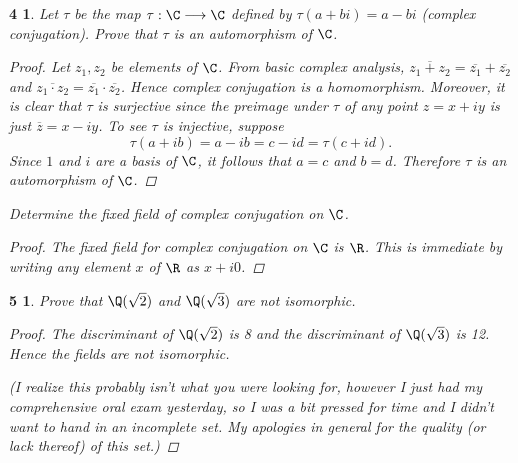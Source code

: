 \documentclass[10pt]{amsart}
\begin{document}
\newtheorem*{4}{4}

\begin{4}
  \label{Ex4}
  Let $\tau$ be the map $\tau:\C \longrightarrow \C$ defined by $\tau(a + bi) = a - bi$ (complex conjugation).
  Prove that $\tau$ is an automorphism of $\C$.
  
  \begin{proof}
    Let $z_1, z_2$ be elements of $\C$.
    From basic complex analysis, $\overline{z_1 + z_2} = \overline{z_1} + \overline{z_2}$ and $\overline{z_1 \cdot z_2} = \overline{z_1}\cdot\overline{z_2}$.
    Hence complex conjugation is a homomorphism.
    Moreover, it is clear that $\tau$ is surjective since the preimage under $\tau$ of any point $z = x + iy$ is just $\overline{z} = x - iy$.
    To see $\tau$ is injective, suppose $$\tau(a+ib) = a - ib = c - id= \tau(c + id).$$
    Since $1$ and $i$ are a basis of $\C$, it follows that $a = c$ and $b = d$.
    Therefore $\tau$ is an automorphism of $\C$.
  \end{proof}

  Determine the fixed field of complex conjugation on $\C$.
  
  \begin{proof}
    The fixed field for complex conjugation on $\C$ is $\R$.
    This is immediate by writing any element $x$ of $\R$ as $x + i0$.
  \end{proof}
\end{4}

\newtheorem*{5}{5}

\begin{5}
  \label{Ex5}
  Prove that $\Q(\sqrt{2})$ and $\Q(\sqrt{3})$ are not isomorphic.
  
  \begin{proof}
    The discriminant of $\Q(\sqrt{2})$ is 8 and the discriminant of $\Q(\sqrt{3})$ is 12.
    Hence the fields are not isomorphic.

    (I realize this probably isn't what you were looking for, however I just had my comprehensive oral exam yesterday, so I was a bit pressed for time and I didn't want to hand in an incomplete set.  My apologies in general for the quality (or lack thereof) of this set.)
  \end{proof}
\end{5}

\newtheorem*{6}{6}
\end{document}
